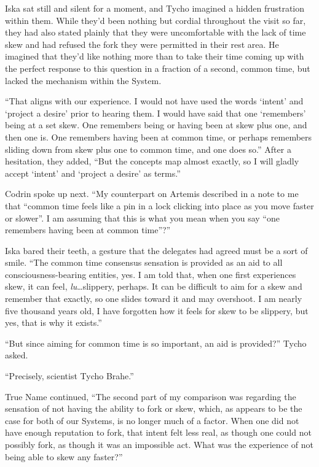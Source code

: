 Iska sat still and silent for a moment, and Tycho imagined a hidden frustration within them. While they'd been nothing but cordial throughout the visit so far, they had also stated plainly that they were uncomfortable with the lack of time skew and had refused the fork they were permitted in their rest area. He imagined that they'd like nothing more than to take their time coming up with the perfect response to this question in a fraction of a second, common time, but lacked the mechanism within the System.

``That aligns with our experience. I would not have used the words `intent' and `project a desire' prior to hearing them. I would have said that one `remembers' being at a set skew. One remembers being or having been at skew plus one, and then one is. One remembers having been at common time, or perhaps remembers sliding down from skew plus one to common time, and one does so.'' After a hesitation, they added, ``But the concepts map almost exactly, so I will gladly accept `intent' and `project a desire' as terms.''

Codrin spoke up next. ``My counterpart on Artemis described in a note to me that ``common time feels like a pin in a lock clicking into place as you move faster or slower''. I am assuming that this is what you mean when you say ``one remembers having been at common time''?''

Iska bared their teeth, a gesture that the delegates had agreed must be a sort of smile. ``The common time consensus sensation is provided as an aid to all consciousness-bearing entities, yes. I am told that, when one first experiences skew, it can feel, \emph{lu}\ldots slippery, perhaps. It can be difficult to aim for a skew and remember that exactly, so one slides toward it and may overshoot. I am nearly five thousand years old, I have forgotten how it feels for skew to be slippery, but yes, that is why it exists.''

``But since aiming for common time is so important, an aid is provided?'' Tycho asked.

``Precisely, scientist Tycho Brahe.''

True Name continued, ``The second part of my comparison was regarding the sensation of not having the ability to fork or skew, which, as appears to be the case for both of our Systems, is no longer much of a factor. When one did not have enough reputation to fork, that intent felt less real, as though one could not possibly fork, as though it was an impossible act. What was the experience of not being able to skew any faster?''

